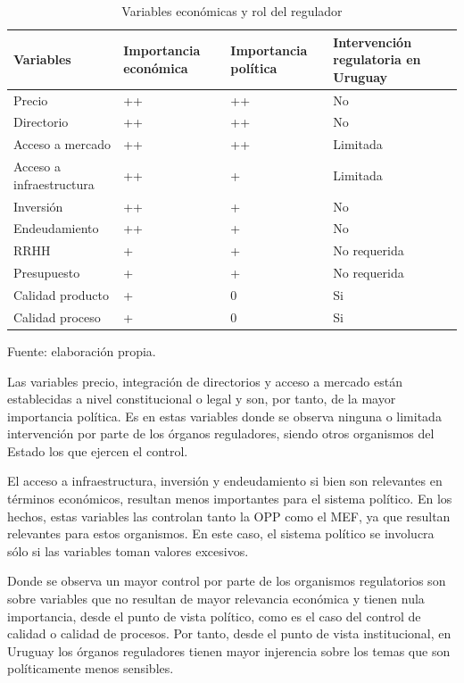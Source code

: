 \documentclass[
  12pt,
  spanish,
]{book}
\begin{document}
\begin{table}

\caption{\label{tab:cuadro9}Variables económicas y rol del regulador}
\centering
\begin{tabular}[t]{l|l|l|l}
\hline
Variables & Importancia económica & Importancia política & Intervención regulatoria en Uruguay\\
\hline
Precio & ++ & ++ & No\\
\hline
Directorio & ++ & ++ & No\\
\hline
Acceso a mercado & ++ & ++ & Limitada\\
\hline
Acceso a infraestructura & ++ & + & Limitada\\
\hline
Inversión & ++ & + & No\\
\hline
Endeudamiento & ++ & + & No\\
\hline
RRHH & + & + & No requerida\\
\hline
Presupuesto & + & + & No requerida\\
\hline
Calidad producto & + & 0 & Si\\
\hline
Calidad proceso & + & 0 & Si\\
\hline
\end{tabular}
\end{table}

Fuente: elaboración propia.

Las variables precio, integración de directorios y acceso a mercado están establecidas a nivel constitucional o legal y son, por tanto, de la mayor importancia política. Es en estas variables donde se observa ninguna o limitada intervención por parte de los órganos reguladores, siendo otros organismos del Estado los que ejercen el control.

El acceso a infraestructura, inversión y endeudamiento si bien son relevantes en términos económicos, resultan menos importantes para el sistema político. En los hechos, estas variables las controlan tanto la OPP como el MEF, ya que resultan relevantes para estos organismos. En este caso, el sistema político se involucra sólo si las variables toman valores excesivos.

Donde se observa un mayor control por parte de los organismos regulatorios son sobre variables que no resultan de mayor relevancia económica y tienen nula importancia, desde el punto de vista político, como es el caso del control de calidad o calidad de procesos. Por tanto, desde el punto de vista institucional, en Uruguay los órganos reguladores tienen mayor injerencia sobre los temas que son políticamente menos sensibles.
\end{document}
